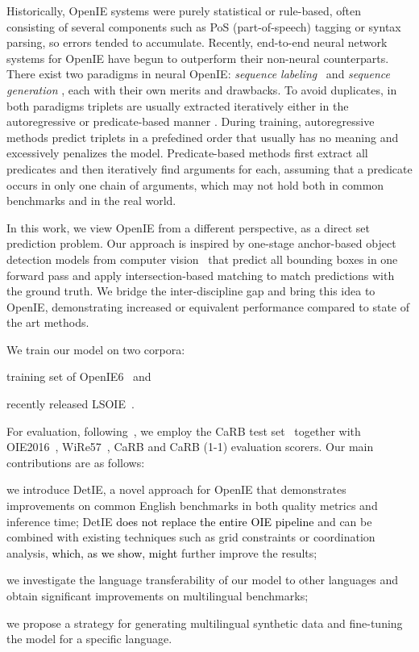 \documentclass[letterpaper]{article} \usepackage{aaai22}  \usepackage{times}  \usepackage{helvet}  \usepackage{courier}  \usepackage[hyphens]{url}  \usepackage{graphicx} \usepackage{placeins}
\newcommand{\added}[1]{\textcolor{black}{#1}}
\begin{document}
Historically, OpenIE systems were purely statistical or rule-based, often consisting of several components such as PoS (part-of-speech) tagging or syntax parsing, so errors tended to accumulate. Recently, end-to-end neural network systems for OpenIE have begun to outperform their non-neural counterparts.  There exist two paradigms in neural OpenIE: \emph{sequence labeling}~\cite{stanovsky-etal-2018-supervised,roy-etal-2019-supervising,kolluru2020openie6} and \emph{sequence generation} \cite{cui-etal-2018-neural,kolluru2020imojie}, each with their own merits and drawbacks.
To avoid duplicates, in both paradigms triplets are usually extracted iteratively either in the autoregressive \cite{kolluru2020openie6,kolluru2020imojie} or predicate-based manner \cite{ro2020multi}.
During training, autoregressive methods predict triplets in a prefedined order that usually has no meaning and excessively penalizes the model.
Predicate-based methods first extract all predicates and then iteratively find arguments for each, assuming that a predicate occurs in only one chain of arguments, which may not hold both in common benchmarks and in the real world.

In this work, we view OpenIE from a different perspective, as a direct set prediction problem. Our approach is inspired by one-stage anchor-based object detection models from computer vision~\cite{SSD,tan2020efficientdet}
that predict all bounding boxes in one forward pass and apply intersection-based matching to match predictions with the ground truth.
We bridge the inter-discipline gap and bring this idea to OpenIE, demonstrating increased or equivalent performance compared to state of the art methods.

We train our model on two corpora: 
\begin{inparaenum}[(1)]
\item training set of OpenIE6~\cite{kolluru2020openie6} and 
\item recently released LSOIE~\cite{lsoie-2021}.
\end{inparaenum}
For evaluation, following~\citet{kolluru2020openie6}, we employ 
the CaRB test set~\cite{bhardwaj-etal-2019-carb} together with OIE2016~\cite{Stanovsky2016EMNLP}, WiRe57~\cite{lechelle2019wire57}, CaRB and CaRB (1-1) evaluation scorers.
Our main contributions are as follows:
\begin{inparaenum}[(1)]
    \item we introduce DetIE, a novel approach for OpenIE that demonstrates improvements on common English benchmarks in both quality metrics and inference time; DetIE \added{does not replace the entire OIE pipeline} and can be combined with existing techniques such as grid constraints or coordination analysis, \added{which, as we show, might}  further improve the results;
    \item we investigate the language transferability of our model to other languages and obtain significant improvements on multilingual benchmarks;
    \item we propose a strategy for generating multilingual synthetic data and fine-tuning the model for a specific language.
\end{inparaenum}
\end{document}
